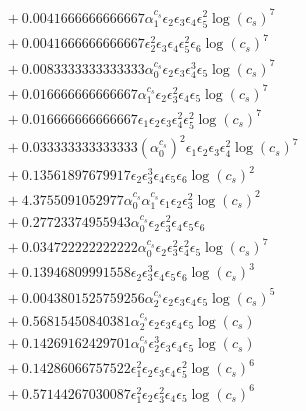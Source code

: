 \documentclass[10pt]{article}
\begin{document}
\begin{align*}
&{}  + 0.0041666666666667 \alpha_{1}^{c_s} \epsilon_{2} \epsilon_{3} \epsilon_{4} \epsilon_{5}^{2} \log{\left(c_{s} \right)}^{7} \\
&{}  + 0.0041666666666667 \epsilon_{2}^{2} \epsilon_{3} \epsilon_{4} \epsilon_{5}^{2} \epsilon_{6} \log{\left(c_{s} \right)}^{7} \\
&{}  + 0.0083333333333333 \alpha_{0}^{c_s} \epsilon_{2} \epsilon_{3} \epsilon_{4}^{3} \epsilon_{5} \log{\left(c_{s} \right)}^{7} \\
&{}  + 0.016666666666667 \alpha_{1}^{c_s} \epsilon_{2} \epsilon_{3}^{2} \epsilon_{4} \epsilon_{5} \log{\left(c_{s} \right)}^{7} \\
&{}  + 0.016666666666667 \epsilon_{1} \epsilon_{2} \epsilon_{3} \epsilon_{4}^{2} \epsilon_{5}^{2} \log{\left(c_{s} \right)}^{7} \\
&{}  + 0.033333333333333 \left(\alpha_{0}^{c_s}\right)^{2} \epsilon_{1} \epsilon_{2} \epsilon_{3} \epsilon_{4}^{2} \log{\left(c_{s} \right)}^{7} \\
&{}  + 0.13561897679917 \epsilon_{2} \epsilon_{3}^{3} \epsilon_{4} \epsilon_{5} \epsilon_{6} \log{\left(c_{s} \right)}^{2} \\
&{}  + 4.3755091052977 \alpha_{0}^{c_s} \alpha_{1}^{c_s} \epsilon_{1} \epsilon_{2} \epsilon_{3}^{2} \log{\left(c_{s} \right)}^{2} \\
&{}  + 0.27723374955943 \alpha_{0}^{c_s} \epsilon_{2} \epsilon_{3}^{2} \epsilon_{4} \epsilon_{5} \epsilon_{6} \\
&{}  + 0.034722222222222 \alpha_{0}^{c_s} \epsilon_{2} \epsilon_{3}^{2} \epsilon_{4}^{2} \epsilon_{5} \log{\left(c_{s} \right)}^{7} \\
&{}  + 0.13946809991558 \epsilon_{2} \epsilon_{3}^{3} \epsilon_{4} \epsilon_{5} \epsilon_{6} \log{\left(c_{s} \right)}^{3} \\
&{}  + 0.0043801525759256 \alpha_{2}^{c_s} \epsilon_{2} \epsilon_{3} \epsilon_{4} \epsilon_{5} \log{\left(c_{s} \right)}^{5} \\
&{}  + 0.56815450840381 \alpha_{2}^{c_s} \epsilon_{2} \epsilon_{3} \epsilon_{4} \epsilon_{5} \log{\left(c_{s} \right)} \\
&{}  + 0.14269162429701 \alpha_{0}^{c_s} \epsilon_{2}^{3} \epsilon_{3} \epsilon_{4} \epsilon_{5} \log{\left(c_{s} \right)} \\
&{}  + 0.14286066757522 \epsilon_{1}^{2} \epsilon_{2} \epsilon_{3} \epsilon_{4} \epsilon_{5}^{2} \log{\left(c_{s} \right)}^{6} \\
&{}  + 0.57144267030087 \epsilon_{1}^{2} \epsilon_{2} \epsilon_{3}^{2} \epsilon_{4} \epsilon_{5} \log{\left(c_{s} \right)}^{6} \\

\end{align*}
\end{document}
